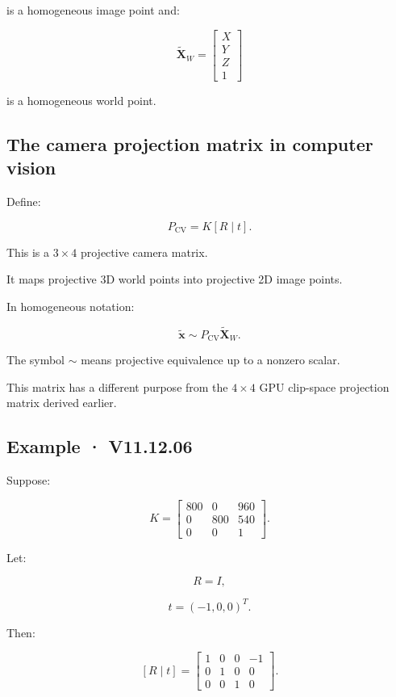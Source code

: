 is a homogeneous image point and:

\[
 \tilde{\mathbf X}_W= \begin{bmatrix}X\\Y\\Z\\1\end{bmatrix}
\]

is a homogeneous world point.

\subsection{The camera projection matrix in computer vision}\label{02-foundations-ii-ch035-the-camera-projection-matrix-in-computer-vision}

Define:

\[
 \boxed{ P_{\mathrm{CV}}=K[R\mid t] }.
\]

This is a \(3\times4\) projective camera matrix.

It maps projective 3D world points into projective 2D image points.

In homogeneous notation:

\[
 \boxed{ \tilde{\mathbf x}\sim P_{\mathrm{CV}}\tilde{\mathbf X}_W }.
\]

The symbol \(\sim\) means projective equivalence up to a nonzero scalar.

This matrix has a different purpose from the \(4\times4\) GPU clip-space projection matrix derived earlier.

\subsection{Example · V11.12.06}\label{02-foundations-ii-ch035-example-v11.12.06}

Suppose:

\[
 K= \begin{bmatrix} 800&0&960\\ 0&800&540\\ 0&0&1 \end{bmatrix}.
\]

Let:

\[
 R=I,
\]

\[
 t=(-1,0,0)^T.
\]

Then:

\[
 [R\mid t] = \begin{bmatrix} 1&0&0&-1\\ 0&1&0&0\\ 0&0&1&0 \end{bmatrix}.
\]

